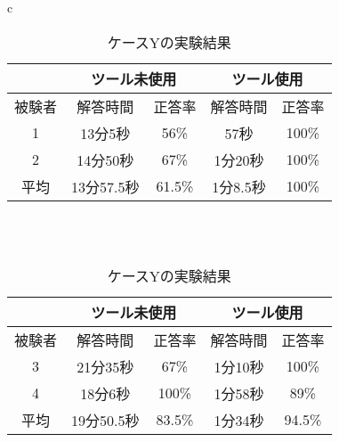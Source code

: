 \documentclass[uplatex, 10pt, a4p]{jsarticle}
\begin{document}
\begin{table}[tp]
  \centering
    \begin{tabular}{c}
      \begin{minipage}{\hsize}
        \centering
        \caption{ケースXの実験結果}
        \label{resultX}
        \begin{tabular}{c|c|c|c|c|}
        \cline{2-5}
                                  & \multicolumn{2}{c|}{ツール未使用} & \multicolumn{2}{c|}{ツール使用} \\ \hline
        \multicolumn{1}{|c||}{被験者} & 解答時間           & 正答率          & 解答時間           & 正答率         \\ \hline\hline
        \multicolumn{1}{|c||}{1}   & 13分5秒           & 56\%         & 57秒           & 100\%         \\ \hline
        \multicolumn{1}{|c||}{2}   & 14分50秒          & 67\%          & 1分20秒          & 100\%         \\ \hline\hline
        \multicolumn{1}{|c||}{平均}   & 13分57.5秒          & 61.5\%          & 1分8.5秒          & 100\%         \\ \hline
        \end{tabular}
      \end{minipage}\\\\

      \begin{minipage}{\hsize}
        \centering
        \caption{ケースYの実験結果}
        \label{resultY}
        \begin{tabular}{c|c|c|c|c|}
        \cline{2-5}
                                  & \multicolumn{2}{c|}{ツール未使用} & \multicolumn{2}{c|}{ツール使用} \\ \hline
        \multicolumn{1}{|c||}{被験者} & 解答時間           & 正答率          & 解答時間           & 正答率         \\ \hline\hline
        \multicolumn{1}{|c||}{3}   & 21分35秒           & 67\%         & 1分10秒           & 100\%         \\ \hline
        \multicolumn{1}{|c||}{4}   & 18分6秒          & 100\%          & 1分58秒          & 89\%         \\ \hline\hline
        \multicolumn{1}{|c||}{平均}   & 19分50.5秒          & 83.5\%          & 1分34秒          & 94.5\%         \\ \hline
        \end{tabular}
      \end{minipage}
    \end{tabular}
\end{table}
\end{document}
